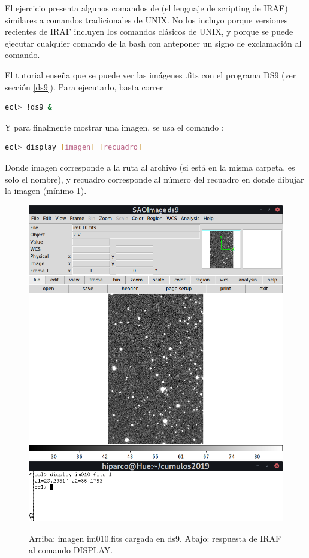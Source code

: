 \documentclass[12pt]{article}
\begin{document}
El ejercicio presenta algunos comandos de  (el lenguaje de scripting de IRAF) similares a comandos tradicionales de UNIX.
No los incluyo porque versiones recientes de IRAF incluyen los comandos clásicos de UNIX, y porque se puede ejecutar cualquier comando de la bash con anteponer un signo de exclamación al comando.

El tutorial enseña que se puede ver las imágenes .fits con el programa DS9 (ver sección \ref{ds9}).
Para ejecutarlo, basta correr
\begin{lstlisting}[language=bash]
ecl> !ds9 &
\end{lstlisting}
Y para finalmente mostrar una imagen, se usa el comando :
\begin{lstlisting}[language=bash]
ecl> display [imagen] [recuadro]
\end{lstlisting}
Donde imagen corresponde a la ruta al archivo (si está en la misma carpeta, es solo el nombre), y recuadro corresponde al número del recuadro en donde dibujar la imagen (mínimo 1).

\begin{figure}[H]
  \centering
   \includegraphics[scale= 0.5]{im03.png}
      \includegraphics[scale= 0.6]{im03a.png}
  \caption{Arriba: imagen im010.fits cargada en ds9. Abajo: respuesta de IRAF al comando DISPLAY.}
  \label{im03}
\end{figure}
\end{document}
